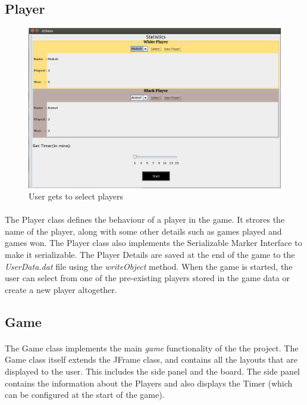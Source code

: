 \subsection{Player}
\begin{figure}[htb]
\centering
\includegraphics[scale=0.3]{SS-NewGame.png} %
\caption{User gets to select players}
\label{fig:label} %
\end{figure}
\paragraph{}
The Player class defines the behaviour of a player in the game. It strores the name of the player, along with some other details such as games played and games won. The Player class also implements the Serializable Marker Interface to make it serializable. The Player Details are saved at the end of the game to the \textit{UserData.dat} file using the \textit{writeObject} method. When the game is started, the user can select from one of the pre-existing players stored in the game data or create a new player altogether.


\subsection{Game}
\paragraph{}
The Game class implements the main \textit{game} functionality of the the project. The Game class itself extends the JFrame class, and contains all the layouts that are displayed to the user. This includes the side panel and the board. The side panel contains the information about the Players and also displays the Timer (which can be configured at the start of the game).

